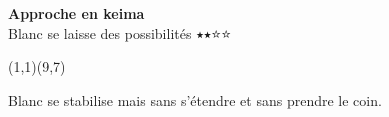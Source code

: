 \documentclass[preview, border=0pt, varwidth=false]{standalone}
\begin{document}
	\setgounit{0.6cm} 
	
\parbox[c][14.65cm][c]{10.2cm}{
	\centering
	
	{\Large\textbf{Approche en keima} \\ Blanc se laisse des possibilités $\medblackstar \medblackstar \medwhitestar \medwhitestar$}
	\vspace{3em}
	
	\begin{psgopartialboard}{(1,1)(9,7)}
		\pass
	\end{psgopartialboard}
	
	\vspace{1em}
	Blanc se stabilise mais sans s'étendre et sans prendre le coin.
}
\end{document}
